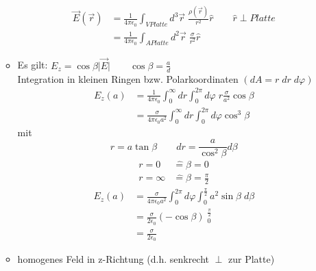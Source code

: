 \documentclass[titlepage,12pt,a4paper,ngerman]{report}
\begin{document}
\begin{itemize}
\begin{itemize}
\begin{align*}
\vec{E}(\vec{r}) &= \frac{1}{4 \pi \epsilon_0} \int_{V Platte} d^3 \vec{r}\; \frac{\rho ( \vec{r})}{r^2} \hat{r}\qquad \hat{r} \perp Platte\\
&= \frac{1}{4\pi\epsilon_0} \int_{A Platte} d^2 \vec{r} \; \frac{\sigma}{r^2} \hat{r}
\end{align*}

\item Es gilt: $E_z = \cos\beta \vert \vec{E} \vert \qquad \cos\beta = \frac{a}{d}$\\
Integration in kleinen Ringen bzw. Polarkoordinaten
$(dA = r \; dr \; d\varphi)$
\begin{align*}
E_z(a) &= \frac{1}{4\pi\epsilon_0} \int_0^\infty dr \int_0^{2\pi} d\varphi \; r \frac{\sigma}{a^2} \cos \beta\\[15pt]
&= \frac{\sigma}{4 \pi \epsilon_0a^2} \int_0^\infty dr \int_0^{2\pi} d\varphi \cos^3\beta
\end{align*}
mit $$ r=a\tan \beta\qquad dr = \frac{a}{\cos^2 \beta} d\beta $$
\begin{align*}
r=0 & \widehat{ = } \beta = 0\\
r=\infty & \widehat{ = } \beta = \frac{\pi}{2}
\end{align*}
\begin{align*}
E_z(a) &=  \frac{\sigma}{4 \pi \epsilon_0a^2} \int_0^{2\pi} d\varphi \int_0^{\frac{\pi}{2}} a^2 \sin\beta \; d\beta\\
&= \frac{\sigma}{2\epsilon_0} (-\cos\beta) \mathop{\bigg|}_{0}^{\frac{\pi}{2}}\\
&= \frac{\sigma}{2\epsilon_0}
\end{align*}
\item homogenes Feld in z-Richtung (d.h. senkrecht $\perp$ zur Platte)
\end{itemize}
\end{itemize}

\end{document}
